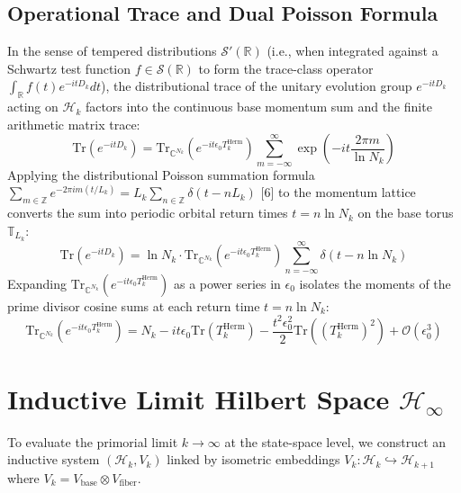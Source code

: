 \documentclass[11pt, a4paper]{article}
\begin{document}
\subsection{Operational Trace and Dual Poisson Formula}
In the sense of tempered distributions $\mathcal{S}'(\mathbb{R})$ (i.e., when integrated against a Schwartz test function $f \in \mathcal{S}(\mathbb{R})$ to form the trace-class operator $\int_{\mathbb{R}} f(t) e^{-itD_k} dt$), the distributional trace of the unitary evolution group $e^{-itD_k}$ acting on $\mathcal{H}_k$ factors into the continuous base momentum sum and the finite arithmetic matrix trace:
\[ \mathrm{Tr}(e^{-itD_k}) = \mathrm{Tr}_{\mathbb{C}^{N_k}}(e^{-it\epsilon_0 T_k^{\mathrm{Herm}}}) \sum_{m=-\infty}^\infty \exp\left(-it\frac{2\pi m}{\ln N_k}\right) \]
Applying the distributional Poisson summation formula $\sum_{m\in\mathbb{Z}} e^{-2\pi i m (t/L_k)} = L_k \sum_{n\in\mathbb{Z}} \delta(t - nL_k)$ [6] to the momentum lattice converts the sum into periodic orbital return times $t = n \ln N_k$ on the base torus $\mathbb{T}_{L_k}$:
\[ \mathrm{Tr}(e^{-itD_k}) = \ln N_k \cdot \mathrm{Tr}_{\mathbb{C}^{N_k}}(e^{-it\epsilon_0 T_k^{\mathrm{Herm}}}) \sum_{n=-\infty}^\infty \delta(t - n \ln N_k) \]
Expanding $\mathrm{Tr}_{\mathbb{C}^{N_k}}(e^{-it\epsilon_0 T_k^{\mathrm{Herm}}})$ as a power series in $\epsilon_0$ isolates the moments of the prime divisor cosine sums at each return time $t = n \ln N_k$:
\[ \mathrm{Tr}_{\mathbb{C}^{N_k}}(e^{-it\epsilon_0 T_k^{\mathrm{Herm}}}) = N_k - it\epsilon_0 \mathrm{Tr}(T_k^{\mathrm{Herm}}) - \frac{t^2 \epsilon_0^2}{2} \mathrm{Tr}((T_k^{\mathrm{Herm}})^2) + \mathcal{O}(\epsilon_0^3) \]

\section{Inductive Limit Hilbert Space $\mathcal{H}_\infty$}
To evaluate the primorial limit $k \rightarrow \infty$ at the state-space level, we construct an inductive system $(\mathcal{H}_k, V_k)$ linked by isometric embeddings $V_k: \mathcal{H}_k \hookrightarrow \mathcal{H}_{k+1}$ where $V_k = V_{\mathrm{base}} \otimes V_{\mathrm{fiber}}$.
\end{document}
